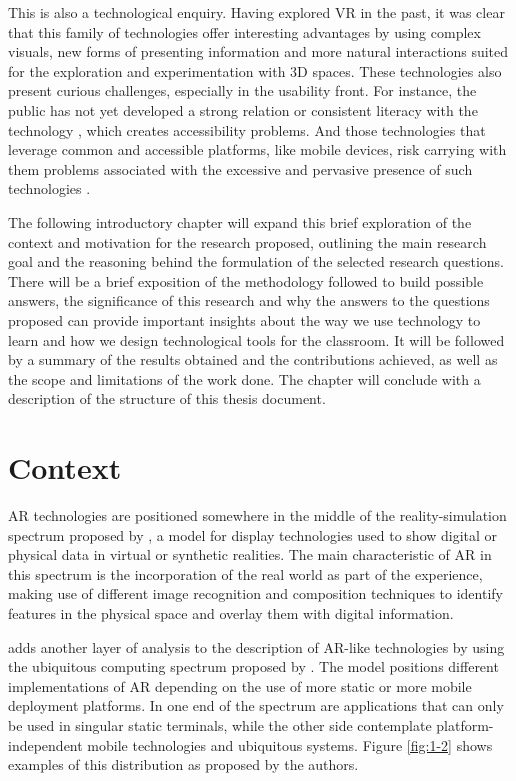 This is also a technological enquiry. Having explored \ac{VR} in the past, it was clear that this family of technologies offer
interesting advantages by using complex visuals, new forms of presenting information and more natural interactions suited for the
exploration and experimentation with 3D spaces. These technologies also present curious challenges, especially in the usability front.
For instance, the public has not yet developed a strong relation or consistent literacy with the technology \parencite{ozgen_2021}, which
creates accessibility problems. And those technologies that leverage common and accessible platforms, like mobile devices, risk carrying
with them problems associated with the excessive and pervasive presence of such technologies \parencite{forsler_2025,petrucco_2021}.

The following introductory chapter will expand this brief exploration of the context and motivation for the research proposed, outlining
the main research goal and the reasoning behind the formulation of the selected research questions. There will be a brief exposition of
the methodology followed to build possible answers, the significance of this research and why the answers to the questions proposed can
provide important insights about the way we use technology to learn and how we design technological tools for the classroom. It will be
followed by a summary of the results obtained and the contributions achieved, as well as the scope and limitations of the work done. The
chapter will conclude with a description of the structure of this thesis document.

\section{Context \label{sec:1-1}}

\ac{AR} technologies are positioned somewhere in the middle of the reality-simulation spectrum proposed by \textcite{milgram_1995}, a model
for display technologies used to show digital or physical data in virtual or synthetic realities. The main characteristic of \ac{AR} in
this spectrum is the incorporation of the real world as part of the experience, making use of different image recognition and composition
techniques to identify features in the physical space and overlay them with digital information.

\textcite{schmalstieg_2016} adds another layer of analysis to the description of \ac{AR}-like technologies by using the ubiquitous
computing spectrum proposed by \textcite{weiser_1991}. The model positions different implementations of \ac{AR} depending on the use of
more static or more mobile deployment platforms. In one end of the spectrum are applications that can only be used in singular static
terminals, while the other side contemplate platform-independent mobile technologies and ubiquitous systems. Figure \ref{fig:1-2} shows examples
of this distribution as proposed by the authors.

